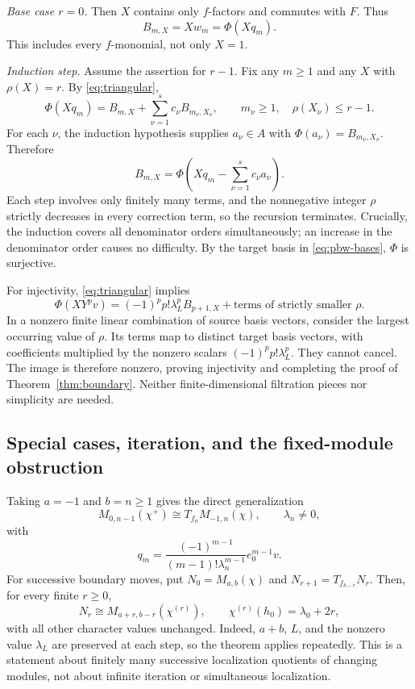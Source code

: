 \documentclass[11pt]{article}
\theoremstyle{definition}
\begin{document}
\emph{Base case \(r=0\).}
Then \(X\) contains only \(f\)-factors and commutes with \(F\). Thus
\[
 B_{m,X}=Xw_m=\Phi(Xq_m).
\]
This includes every \(f\)-monomial, not only \(X=1\).

\emph{Induction step.}
Assume the assertion for \(r-1\). Fix any \(m\ge1\) and any \(X\)
with \(\rho(X)=r\). By \eqref{eq:triangular},
\[
 \Phi(Xq_m)=B_{m,X}+\sum_{\nu=1}^{s}c_\nu B_{m_\nu,X_\nu},
 \qquad m_\nu\ge1,\quad\rho(X_\nu)\le r-1.
\]
For each \(\nu\), the induction hypothesis supplies \(a_\nu\in A\)
with \(\Phi(a_\nu)=B_{m_\nu,X_\nu}\). Therefore
\[
 B_{m,X}=\Phi\left(Xq_m-\sum_{\nu=1}^{s}c_\nu a_\nu\right).
\]
Each step involves only finitely many terms, and the nonnegative
integer \(\rho\) strictly decreases in every correction term, so the
recursion terminates. Crucially, the induction covers all denominator
orders simultaneously; an increase in the denominator order causes
no difficulty. By the target basis in \eqref{eq:pbw-bases}, \(\Phi\)
is surjective.

For injectivity, \eqref{eq:triangular} implies
\[
 \Phi(XY^pv)=(-1)^pp!\lambda_L^pB_{p+1,X}
       +\text{terms of strictly smaller }\rho.
\]
In a nonzero finite linear combination of source basis vectors,
consider the largest occurring value of \(\rho\). Its terms map to
distinct target basis vectors, with coefficients multiplied by the
nonzero scalars \((-1)^pp!\lambda_L^p\). They cannot cancel. The image
is therefore nonzero, proving injectivity and completing the proof of
Theorem~\ref{thm:boundary}. Neither finite-dimensional filtration
pieces nor simplicity are needed.

\subsection{Special cases, iteration, and the fixed-module obstruction}

Taking \(a=-1\) and \(b=n\ge1\) gives the direct generalization
\begin{equation}\label{eq:fn-special}
 M_{0,n-1}(\chi^+)\cong T_{f_n}M_{-1,n}(\chi),
 \qquad\lambda_n\ne0,
\end{equation}
with
\[
 q_m=\frac{(-1)^{m-1}}{(m-1)!\lambda_n^{m-1}}e_0^{m-1}v.
\]
For successive boundary moves, put
\(N_0=M_{a,b}(\chi)\) and \(N_{r+1}=T_{f_{b-r}}N_r\). Then, for every
finite \(r\ge0\),
\[
 N_r\cong M_{a+r,b-r}(\chi^{(r)}),\qquad
 \chi^{(r)}(h_0)=\lambda_0+2r,
\]
with all other character values unchanged. Indeed, \(a+b\), \(L\),
and the nonzero value \(\lambda_L\) are preserved at each step, so
the theorem applies repeatedly. This is a statement about finitely
many successive localization quotients of changing modules, not about
infinite iteration or simultaneous localization.
\end{document}
